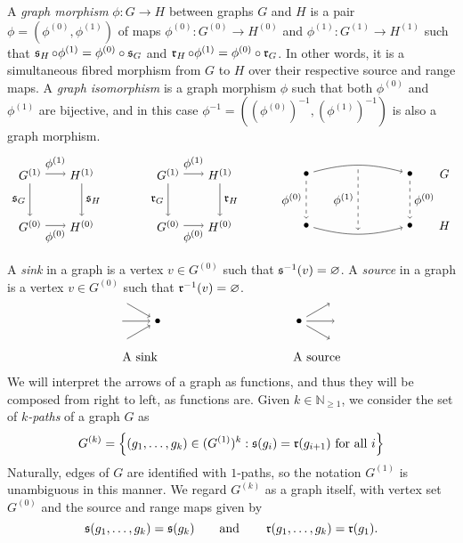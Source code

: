 A \emph{graph morphism} $\phi\colon G\to H$ between graphs $G$ and $H$ is a pair $\phi=(\phi^{(0)},\phi^{(1)})$ of maps $\phi^{(0)}\colon G^{(0)}\to H^{(0)}$ and $\phi^{(1)}\colon G^{(1)}\to H^{(1)}$ such that $\operatorname{\mathfrak{s}}_H\circ\phi^{(1)}=\phi^{(0)}\circ\operatorname{\mathfrak{s}}_G$ and $\operatorname{\mathfrak{r}}_H\circ\phi^{(1)}=\phi^{(0)}\circ\operatorname{\mathfrak{r}}_G$. In other words, it is a simultaneous fibred morphism from $G$ to $H$ over their respective source and range maps. A \emph{graph isomorphism} is a graph morphism $\phi$ such that both $\phi^{(0)}$ and $\phi^{(1)}$ are bijective, and in this case $\phi^{-1}=((\phi^{(0)})^{-1},(\phi^{(1)})^{-1})$ is also a graph morphism.
\[\begin{tikzpicture}
\node (G1) at (0,1) {$G^{(1)}$};
\node (G2) at ([shift={+(4,0)}]G1) {$G^{(1)}$};
\foreach \i in {1,2}
{\node (G\i2) at ([shift={+(1.5,0)}]G\i) {$H^{(1)}$};
\node (G\i3) at ([shift={+(0,-1.5)}]G\i) {$G^{(0)}$};
\node (G\i4) at ([shift={+(1.5,0)}]G\i3) {$H^{(0)}$};
\draw[->] (G\i)--(G\i2) node[above,midway] {$\phi^{(1)}$};
\draw[->] (G\i)--(G\i3) node[left,midway] {${\ifthenelse{\i=1}{\so}{\ra}}_G$};
\draw[->] (G\i3)--(G\i4) node[below,midway] {$\phi^{(0)}$};
\draw[->] (G\i2)--(G\i4) node[right,midway] {${\ifthenelse{\i=1}{\so}{\ra}}_H$};}
\node (G3) at ([shift={+(4,0)}]G2) {$\bullet$};
\node (G32) at ([shift={+(3,0)}]G3) {$\bullet$};
\node (G33) at ([shift={+(0,-1.5)}]G3) {$\bullet$};
\node (G34) at ([shift={+(0,-1.5)}]G32) {$\bullet$};
\draw[->] (G3) to[out=15,in=165] node[midway] (M1) {} (G32);
\draw[->] (G33) to[out=-15,in=195] node[midway] (M2) {} (G34);
\draw[->,dashed,thin] (M1)--(M2) node[midway,left] {$\phi^{(1)}$};
\draw[->,dashed,thin] (G3)--(G33) node[midway,left] {$\phi^{(0)}$};
\draw[->,dashed,thin] (G32)--(G34) node[midway,right] {$\phi^{(0)}$};
\node at ([shift={+(1,0)}]G32) {$G$};
\node at ([shift={+(1,0)}]G34) {$H$};
\end{tikzpicture}\]

A \emph{sink} in a graph is a vertex $v\in G^{(0)}$ such that $\operatorname{\mathfrak{s}}^{-1}(v)=\varnothing$. A \emph{source} in a graph is a vertex $v\in G^{(0)}$ such that $\operatorname{\mathfrak{r}}^{-1}(v)=\varnothing$.
\[
    \begin{tikzpicture}
    \node (N) at (0,0) {$\bullet$};
    \node at (-0.5,-1) {A sink};
    \foreach \x in {150,180,210}
    {\draw[->] (N)+(\x:1)--(N);}
    \node (B) at (4,0) {$\bullet$};
    \node at (4.5,-1) {A source};
    \foreach \x in {0,30,330}
    {\draw[->] (B)--+(\x:1);}
    \end{tikzpicture}
\]
We will interpret the arrows of a graph as functions, and thus they will be composed from right to left, as functions are. Given $k\in\mathbb{N}_{\geq 1}$, we consider the set of \emph{$k$-paths} of a graph $G$ as
\[G^{(k)}=\left\{(g_1,\ldots,g_k)\in (G^{(1)})^ k:\operatorname{\mathfrak{s}}(g_i)=\operatorname{\mathfrak{r}}(g_{i+1})\text{ for all }i\right\}\]
Naturally, edges of $G$ are identified with $1$-paths, so the notation $G^{(1)}$ is unambiguous in this manner. We regard $G^ {(k)}$ as a graph itself, with vertex set $G^{(0)}$ and the source and range maps given by
\[\operatorname{\mathfrak{s}}(g_1,\ldots,g_k)=\operatorname{\mathfrak{s}}(g_k)\qquad\text{and}\qquad\operatorname{\mathfrak{r}}(g_1,\ldots,g_k)=\operatorname{\mathfrak{r}}(g_1).\]

